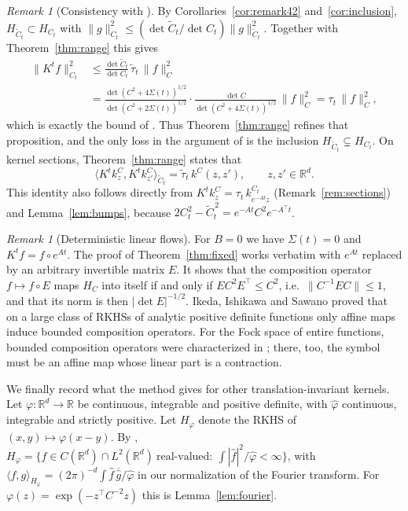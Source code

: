 \documentclass[11pt]{amsart}
\numberwithin{equation}{section}
\theoremstyle{definition}
\theoremstyle{remark}
\newtheorem{remark}[theorem]{Remark}
\newcommand{\R}{\mathbb{R}}
\newcommand{\Ct}{\widetilde{C}_t}
\newcommand{\taut}{\widetilde{\tau}_t}
\newcommand{\ip}[2]{\langle #1,#2\rangle}
\newcommand{\hatf}[1]{\widehat{#1}}
\newcommand{\tp}{\top}
\begin{document}
\begin{remark}[Consistency with {\cite[Proposition~4.1]{PSWPN}}]\label{rem:consistency}
By Corollaries~\ref{cor:remark42} and~\ref{cor:inclusion}, $H_{\Ct}\subset H_{C_t}$ with
$\|g\|_{C_t}^2\le(\det\Ct/\det C_t)\|g\|_{\Ct}^2$. Together with Theorem~\ref{thm:range} this gives
\begin{align*}
\|K^tf\|_{C_t}^2&\le\frac{\det\Ct}{\det C_t}\,\taut\,\|f\|_C^2\\
&=\frac{\det(C^2+4\Sigma(t))^{1/2}}{\det(C^2+2\Sigma(t))^{1/2}}\cdot\frac{\det C}{\det(C^2+4\Sigma(t))^{1/2}}\,\|f\|_C^2
=\tau_t\,\|f\|_C^2 ,
\end{align*}
which is exactly the bound of \cite[Proposition~4.1]{PSWPN}. Thus Theorem~\ref{thm:range} refines that proposition,
and the only loss in the argument of \cite{PSWPN} is the inclusion $H_{\Ct}\subsetneq H_{C_t}$. On kernel sections,
Theorem~\ref{thm:range} states that
\[
\ip{K^tk^C_z}{K^tk^C_{z'}}_{\Ct}=\taut\,k^C(z,z'),\qquad z,z'\in\R^d .
\]
This identity also follows directly from $K^tk^C_z=\tau_t\,k^{C_t}_{e^{-At}z}$ (Remark~\ref{rem:sections}) and
Lemma~\ref{lem:bumps}, because
$2C_t^2-\Ct^{\,2}=e^{-At}C^2e^{-A^\tp t}$.
\end{remark}

\begin{remark}[Deterministic linear flows]\label{rem:composition}
For $B=0$ we have $\Sigma(t)=0$ and $K^tf=f\circ e^{At}$. The proof of Theorem~\ref{thm:fixed} works verbatim with $e^{At}$
replaced by an arbitrary invertible matrix $E$. It shows that the composition operator $f\mapsto f\circ E$ maps $H_C$
into itself if and only if $EC^2E^\tp\le C^2$, i.e.\ $\|C^{-1}EC\|\le1$, and that its norm is then $|\det E|^{-1/2}$.
Ikeda, Ishikawa and Sawano \cite{IIS} proved that on a large class of RKHSs of analytic positive definite functions
only affine maps induce bounded composition operators. For the Fock space of entire functions, bounded composition operators were characterized in
\cite{CarswellMacCluerSchuster}; there, too, the symbol must be an affine map whose linear part is a contraction.
\end{remark}

We finally record what the method gives for other translation-invariant kernels. Let $\varphi\colon\R^d\to\R$ be
continuous, integrable and positive definite, with $\hatf\varphi$ continuous, integrable and strictly positive. Let
$H_\varphi$ denote the RKHS of $(x,y)\mapsto\varphi(x-y)$. By \cite[Theorem~10.12]{Wendland},
$H_\varphi=\{f\in C(\R^d)\cap L^2(\R^d)\ \text{real-valued}:\ \int|\hatf f|^2/\hatf\varphi<\infty\}$, with
$\ip fg_{H_\varphi}=(2\pi)^{-d}\int\hatf f\,\overline{\hatf g}/\hatf\varphi$ in our normalization of the Fourier
transform. For $\varphi(z)=\exp(-z^\tp C^{-2}z)$ this is Lemma~\ref{lem:fourier}.
\end{document}
